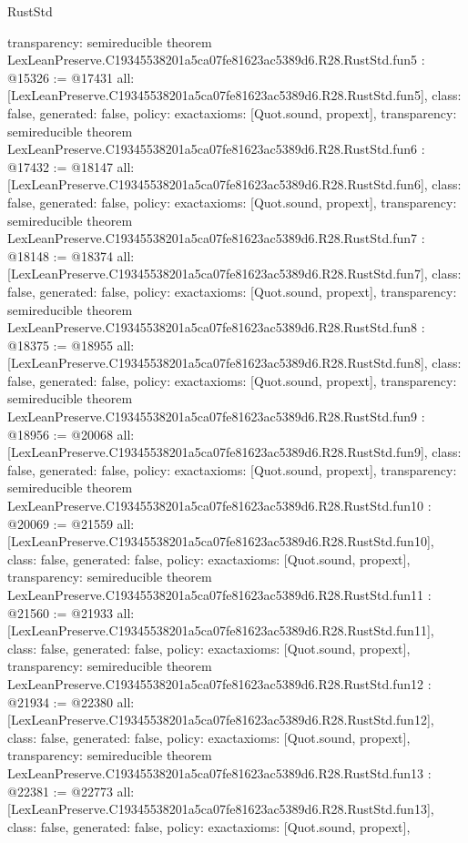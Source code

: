 \begin{lexlean}{RustStd}
\begin{coremodule}
{  transparency: semireducible
}
theorem LexLeanPreserve.C19345538201a5ca07fe81623ac5389d6.R28.RustStd.fun5 : @15326 := @17431 {
  all: [LexLeanPreserve.C19345538201a5ca07fe81623ac5389d6.R28.RustStd.fun5],
  class: false,
  generated: false,
  policy: exact{axioms: [Quot.sound, propext]},
  transparency: semireducible
}
theorem LexLeanPreserve.C19345538201a5ca07fe81623ac5389d6.R28.RustStd.fun6 : @17432 := @18147 {
  all: [LexLeanPreserve.C19345538201a5ca07fe81623ac5389d6.R28.RustStd.fun6],
  class: false,
  generated: false,
  policy: exact{axioms: [Quot.sound, propext]},
  transparency: semireducible
}
theorem LexLeanPreserve.C19345538201a5ca07fe81623ac5389d6.R28.RustStd.fun7 : @18148 := @18374 {
  all: [LexLeanPreserve.C19345538201a5ca07fe81623ac5389d6.R28.RustStd.fun7],
  class: false,
  generated: false,
  policy: exact{axioms: [Quot.sound, propext]},
  transparency: semireducible
}
theorem LexLeanPreserve.C19345538201a5ca07fe81623ac5389d6.R28.RustStd.fun8 : @18375 := @18955 {
  all: [LexLeanPreserve.C19345538201a5ca07fe81623ac5389d6.R28.RustStd.fun8],
  class: false,
  generated: false,
  policy: exact{axioms: [Quot.sound, propext]},
  transparency: semireducible
}
theorem LexLeanPreserve.C19345538201a5ca07fe81623ac5389d6.R28.RustStd.fun9 : @18956 := @20068 {
  all: [LexLeanPreserve.C19345538201a5ca07fe81623ac5389d6.R28.RustStd.fun9],
  class: false,
  generated: false,
  policy: exact{axioms: [Quot.sound, propext]},
  transparency: semireducible
}
theorem LexLeanPreserve.C19345538201a5ca07fe81623ac5389d6.R28.RustStd.fun10 : @20069 := @21559 {
  all: [LexLeanPreserve.C19345538201a5ca07fe81623ac5389d6.R28.RustStd.fun10],
  class: false,
  generated: false,
  policy: exact{axioms: [Quot.sound, propext]},
  transparency: semireducible
}
theorem LexLeanPreserve.C19345538201a5ca07fe81623ac5389d6.R28.RustStd.fun11 : @21560 := @21933 {
  all: [LexLeanPreserve.C19345538201a5ca07fe81623ac5389d6.R28.RustStd.fun11],
  class: false,
  generated: false,
  policy: exact{axioms: [Quot.sound, propext]},
  transparency: semireducible
}
theorem LexLeanPreserve.C19345538201a5ca07fe81623ac5389d6.R28.RustStd.fun12 : @21934 := @22380 {
  all: [LexLeanPreserve.C19345538201a5ca07fe81623ac5389d6.R28.RustStd.fun12],
  class: false,
  generated: false,
  policy: exact{axioms: [Quot.sound, propext]},
  transparency: semireducible
}
theorem LexLeanPreserve.C19345538201a5ca07fe81623ac5389d6.R28.RustStd.fun13 : @22381 := @22773 {
  all: [LexLeanPreserve.C19345538201a5ca07fe81623ac5389d6.R28.RustStd.fun13],
  class: false,
  generated: false,
  policy: exact{axioms: [Quot.sound, propext]},
}
\end{coremodule}
\end{lexlean}
